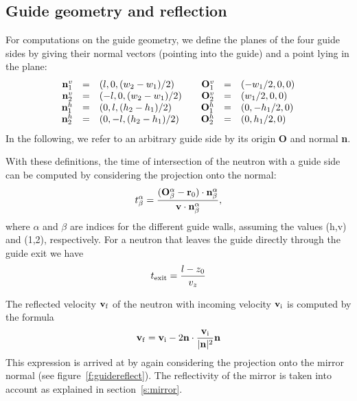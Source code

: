 \subsection{Guide geometry and reflection}
For computations on the guide geometry, we define the planes of the four
guide sides by giving their normal vectors (pointing into the guide)
and a point lying in the plane:
$$
\begin{array}{rclcrcl}
{\bf n}^v_1 &=& (l, 0, {(w_2 - w_1) / 2})
     & & {\bf O}^v_1 &=& (- w_1 / 2, 0, 0) \\
{\bf n}^v_2 &=& (-l, 0, {(w_2 - w_1) / 2})
     & & {\bf O}^v_2 &=& (w_1 / 2, 0, 0) \\
{\bf n}^h_1 &=& (0, l, {(h_2 - h_1) / 2})
     & & {\bf O}^h_1 &=& (0, - h_1 / 2, 0) \\
{\bf n}^h_2 &=& (0, -l, {(h_2 - h_1) / 2})
     & & {\bf O}^h_2 &=& (0, h_1 / 2, 0) \\
\end{array}
$$
In the following, we refer to an arbitrary guide side by its origin
{\bf O} and normal {\bf n}.

With these definitions, the time of intersection of the neutron with a
guide side can be computed by considering the projection onto the
normal:
\begin{equation}
t^\alpha_\beta = \frac{({\bf O}^\alpha_\beta - {\bf r}_0) \cdot {\bf n}^\alpha_\beta}
  {{\bf v} \cdot {\bf n}^\alpha_\beta}  ,
\end{equation}
where $\alpha$ and $\beta$ are indices for the different guide walls,
assuming the values (h,v) and (1,2), respectively.
For a neutron that leaves the guide directly through the guide exit we have
\begin{equation}
t_{\rm exit} = \frac{l - z_0}{v_z}
\end{equation}

The reflected velocity ${\bf v}_{\rm f}$ of the neutron with incoming velocity
${\bf v}_{\rm i}$ is computed by the formula
\begin{equation}
 {\bf v}_{\rm f} =
  {\bf v}_{\rm i}
   - 2{{\bf n} \cdot \frac{{\bf v}_{\rm i}}{{|{\bf n}|^2}} {\bf n}}
\end{equation}
This expression is arrived at by again considering the projection onto
the mirror normal (see figure~\ref{f:guidereflect}). The reflectivity of the
mirror is taken into account as explained in section~\ref{s:mirror}.

